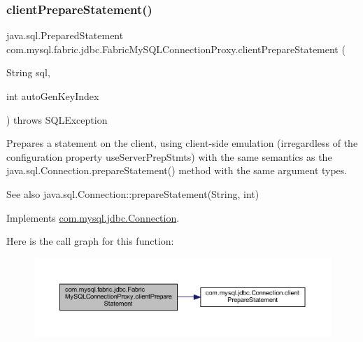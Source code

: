 \subsubsection{\texorpdfstring{client\+Prepare\+Statement()}{clientPrepareStatement()}\hspace{0.1cm}{\footnotesize\ttfamily [2/6]}}
{\footnotesize\ttfamily java.\+sql.\+Prepared\+Statement com.\+mysql.\+fabric.\+jdbc.\+Fabric\+My\+S\+Q\+L\+Connection\+Proxy.\+client\+Prepare\+Statement (\begin{DoxyParamCaption}\item[{String}]{sql,  }\item[{int}]{auto\+Gen\+Key\+Index }\end{DoxyParamCaption}) throws S\+Q\+L\+Exception}

Prepares a statement on the client, using client-\/side emulation (irregardless of the configuration property \textquotesingle{}use\+Server\+Prep\+Stmts\textquotesingle{}) with the same semantics as the java.\+sql.\+Connection.\+prepare\+Statement() method with the same argument types.

\begin{DoxySeeAlso}{See also}
java.\+sql.\+Connection\+::prepare\+Statement(\+String, int) 
\end{DoxySeeAlso}


Implements \mbox{\hyperlink{interfacecom_1_1mysql_1_1jdbc_1_1_connection_a4942503d586cb18634b960ee276fa1bb}{com.\+mysql.\+jdbc.\+Connection}}.

Here is the call graph for this function\+:\nopagebreak
\begin{figure}[H]
\begin{center}
\leavevmode
\includegraphics[width=350pt]{classcom_1_1mysql_1_1fabric_1_1jdbc_1_1_fabric_my_s_q_l_connection_proxy_a60034988ae9a7aedd702c5228602b721_cgraph}
\end{center}
\end{figure}
\mbox{\label{classcom_1_1mysql_1_1fabric_1_1jdbc_1_1_fabric_my_s_q_l_connection_proxy_a60a88d30678ff7c99831615f3b3a4a1b}} 
